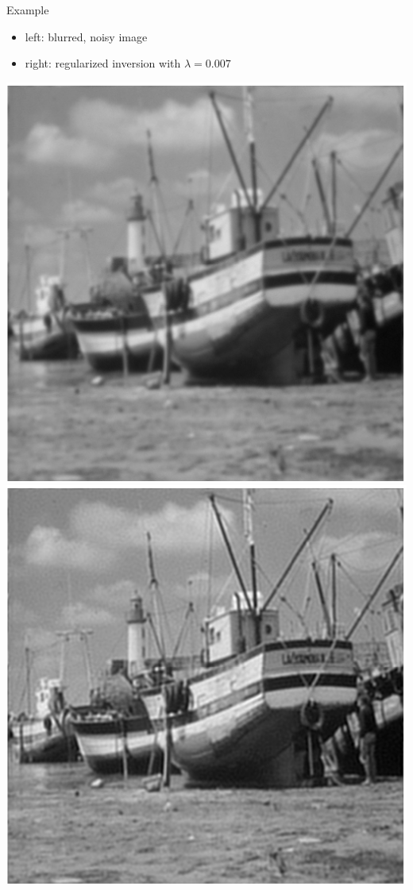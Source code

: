 \documentclass[11pt,mathserif]{beamer}
\begin{document}
\begin{frame}{Example}
\begin{itemize}
\item left: blurred, noisy image
\item right: regularized inversion with
$\lambda = 0.007$
\end{itemize}

\hspace*{\fill}
\includegraphics[width=.4\linewidth]{figures/boat_blurred.eps}
\hspace*{\fill}
\includegraphics[width=.4\linewidth]{figures/boat_deblurred.eps}
\hspace*{\fill}
\end{frame}
\end{document}
